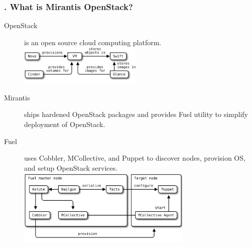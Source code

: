 \documentclass[hyperref=unicode,utf8,xcolor=pst]{beamer}
\begin{document}
\begin{frame}
	\frametitle{\insertframenumber{}. What is Mirantis OpenStack?}

	\begin{description}
		\item[OpenStack] is an open source cloud computing
			platform.\\
			\vspace{0.5ex}
			\includegraphics[height=1.9cm]{openstack-components}
		\item[Mirantis] ships hardened OpenStack packages and
			provides Fuel utility to simplify deployment of
			OpenStack.
		\item[Fuel] uses Cobbler, MCollective, and Puppet to
			discover nodes, provision OS, and setup
			OpenStack services.\\
			\includegraphics[height=3.7cm]{fuel-components}
	\end{description}
\end{frame}
\end{document}
